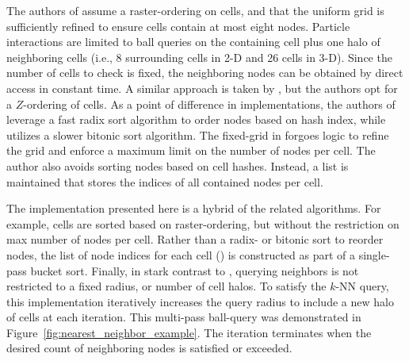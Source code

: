 \documentclass{report}
\begin{document}
The authors of \cite{Krog2010,Johnson2011,Green2010} assume a raster-ordering on cells, and that the uniform grid is sufficiently refined to ensure cells contain at most eight nodes. Particle interactions are limited to ball queries on the containing cell plus one halo of neighboring cells (i.e., 8 surrounding cells in 2-D and 26 cells in 3-D). Since the number of cells to check is fixed, the neighboring nodes can be obtained by direct access in constant time. A similar approach is taken by \cite{Goswami2010}, but the authors opt for a $Z$-ordering of cells. 
 As a point of difference in implementations, the authors of \cite{Green2010, Krog2010, Goswami2010} leverage a fast radix sort algorithm to order nodes based on hash index, while \cite{Johnson2011} utilizes a slower bitonic sort algorithm. The fixed-grid in \cite{Wendland2002,WendlandBook} forgoes logic to refine the grid and enforce a maximum limit on the number of nodes per cell. The author also avoids sorting nodes based on cell hashes. Instead, a list is maintained that stores the indices of all contained nodes per cell. %


The implementation presented here is a hybrid of the related algorithms. For example, cells are sorted based on raster-ordering, but without the restriction on max number of nodes per cell. Rather than a radix- or bitonic sort to reorder nodes, the list of node indices for each cell (\cite{Wendland2002,WendlandBook}) is constructed as part of a single-pass bucket sort. Finally, in stark contrast to  \cite{Krog2010,Green2010,Johnson2011,Wendland2002,WendlandBook}, querying neighbors is not restricted to a fixed radius, or number of cell halos. To satisfy the $k$-NN query, this implementation iteratively increases the query radius to include a new halo of cells at each iteration. This multi-pass ball-query was demonstrated in Figure~\ref{fig:nearest_neighbor_example}. The iteration terminates when the desired count of neighboring nodes is satisfied or exceeded.
\end{document}
